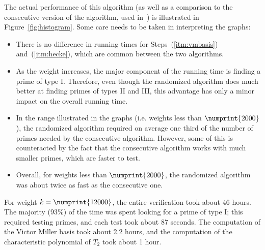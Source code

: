 \documentclass[11pt]{article}
\theoremstyle{plain}
\theoremstyle{definition}
\theoremstyle{remark}
\numberwithin{equation}{section}
\begin{document}
The actual performance of this algorithm (as well as a comparison to the
consecutive version of the algorithm, used in~\cite{ConreyFarmer}) is
illustrated in Figure~\ref{fig:histogram}.  Some care needs to be taken in
interpreting the graphs:
\begin{itemize}
  \item There is no difference in running times for Steps~(\ref{itm:vmbasis}) 
    and~(\ref{itm:hecke}), which 
    are common between the two algorithms.
  \item As the weight increases, the major component of the running time is
    finding a prime of type I.  Therefore, even though the randomized
    algorithm does much better at finding primes of types II and III, this
    advantage has only a minor impact on the overall running time.
  \item In the range illustrated in the graphs (i.e. weights less than
    $\numprint{2000}$), the randomized algorithm required on average one third
    of the number of primes needed by the consecutive algorithm.  However,
    some of this is counteracted by the fact that the consecutive algorithm
    works with much smaller primes, which are faster to test.
  \item Overall, for weights less than $\numprint{2000}$, the randomized 
    algorithm was about twice as fast as the consecutive one.  
\end{itemize}

For weight $k=\numprint{12000}$, the entire verification took about 46 hours.
The majority (93\%) of the time was spent looking for a prime of type I; this
required testing  primes, and each test took about 87 seconds.
The computation of the Victor Miller basis took about 2.2 hours, and the
computation of the characteristic polynomial of $T_2$ took about 1 hour.
\end{document}
